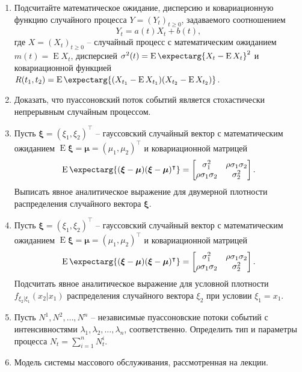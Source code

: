\documentclass[a4paper,12pt]{extreport}
\renewcommand{\=}[1]{\stackrel{#1}{=}} %
\newcommand{\Expect}{\mathop{{}\mathrm{E}}}
\newcommand{\Expectmore}{\operatorname{E}\expectarg}
\newcommand{\generaltime}{t \geqslant 0}
\newcommand{\newprocess}[1]{
	\ensuremath{
		#1 = \left(#1 _t\right)_{\generaltime}
	}
}
\begin{document}
\begin{enumerate}
	\item Подсчитайте математическое ожидание, дисперсию
	и ковариационную функцию случайного процесса
	$\newprocess{Y}$, задаваемого соотношением
	\[
	Y_t = a(t) X_t + b(t),
	\]
	где $\newprocess{X}$ -- случайный процесс с математическим ожиданием 
	$m(t) = \Expect X_t$, дисперсией $\sigma^2(t) = \Expectmore{X_t - \Expect X_t}^2$
	и ковариационной функцией $R(t_1, t_2) = 
	\Expectmore{(X_{t_1} - \Expect X_{t_1})(X_{t_2} - \Expect X_{t_2})}$.

	\item Доказать, что пуассоновский поток событий является стохастически 
	непрерывным случайным процессом.

	\item Пусть $\bm{\xi} = (\xi_1, \xi_2)^{\intercal}$ -- гауссовский случайный вектор
	с математическим ожиданием $\Expect \bm{\xi} = \bm{\mu} = (\mu_1, \mu_2)^{\intercal}$
	и ковариационной матрицей 
	\[
	\Expectmore{(\bm{\xi} - \bm{\mu})(\bm{\xi} - \bm{\mu})^{\intercal}} = 
	  \begin{bmatrix}
	    \sigma_1^2 & \rho \sigma_1 \sigma_2\\
	    \rho \sigma_1 \sigma_2 & \sigma_2^2
	  \end{bmatrix}.
	\]
	Выписать явное аналитическое выражение для двумерной плотности
	распределения случайного вектора $\bm{\xi}$.

	\item Пусть $\bm{\xi} = (\xi_1, \xi_2)^{\intercal}$ -- гауссовский случайный вектор
	с математическим ожиданием $\Expect \bm{\xi} = \bm{\mu} = (\mu_1, \mu_2)^{\intercal}$
	и ковариационной матрицей 
	\[
	\Expectmore{(\bm{\xi} - \bm{\mu})(\bm{\xi} - \bm{\mu})^{\intercal}} = 
	  \begin{bmatrix}
	    \sigma_1^2 & \rho \sigma_1 \sigma_2\\
	    \rho \sigma_1 \sigma_2 & \sigma_2^2
	  \end{bmatrix}.
	\]
	Подсчитать явное аналитическое выражение для условной плотности
	$f_{\xi_2|\xi_1}(x_2 | x_1)$
	распределения случайного вектора $\xi_2$ при условии $\xi_1 = x_1$.

	\item Пусть $N^1, N^2, \ldots, N^n$ -- независимые пуассоновские потоки событий
	с интенсивностями $\lambda_1, \lambda_2, \ldots, \lambda_n$, соответственно.
	Определить тип и параметры процесса $N_t = \sum\limits_{i=1}^n N^i_t$.

	\item Модель системы массового обслуживания, рассмотренная на лекции.
\end{enumerate}
\end{document}
